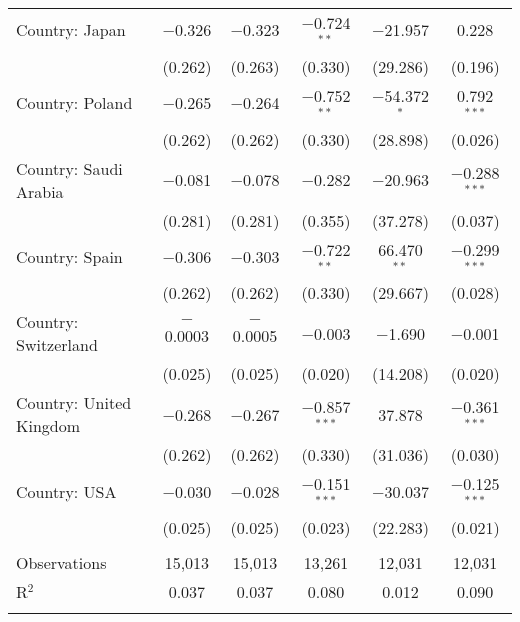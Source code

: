 \begin{tabular}{@{\extracolsep{5pt}}lccccc}
  Country: Japan & $-$0.326 & $-$0.323 & $-$0.724$^{**}$ & $-$21.957 & 0.228 \\ 
  & (0.262) & (0.263) & (0.330) & (29.286) & (0.196) \\ 
  Country: Poland & $-$0.265 & $-$0.264 & $-$0.752$^{**}$ & $-$54.372$^{*}$ & 0.792$^{***}$ \\ 
  & (0.262) & (0.262) & (0.330) & (28.898) & (0.026) \\ 
  Country: Saudi Arabia & $-$0.081 & $-$0.078 & $-$0.282 & $-$20.963 & $-$0.288$^{***}$ \\ 
  & (0.281) & (0.281) & (0.355) & (37.278) & (0.037) \\ 
  Country: Spain & $-$0.306 & $-$0.303 & $-$0.722$^{**}$ & 66.470$^{**}$ & $-$0.299$^{***}$ \\ 
  & (0.262) & (0.262) & (0.330) & (29.667) & (0.028) \\ 
  Country: Switzerland & $-$0.0003 & $-$0.0005 & $-$0.003 & $-$1.690 & $-$0.001 \\ 
  & (0.025) & (0.025) & (0.020) & (14.208) & (0.020) \\ 
  Country: United Kingdom & $-$0.268 & $-$0.267 & $-$0.857$^{***}$ & 37.878 & $-$0.361$^{***}$ \\ 
  & (0.262) & (0.262) & (0.330) & (31.036) & (0.030) \\ 
  Country: USA & $-$0.030 & $-$0.028 & $-$0.151$^{***}$ & $-$30.037 & $-$0.125$^{***}$ \\ 
  & (0.025) & (0.025) & (0.023) & (22.283) & (0.021) \\ 
 \hline \\[-1.8ex] 

Observations & 15,013 & 15,013 & 13,261 & 12,031 & 12,031 \\ 
R$^{2}$ & 0.037 & 0.037 & 0.080 & 0.012 & 0.090 \\ 
\hline 
\hline \\[-1.8ex] 
\end{tabular} 